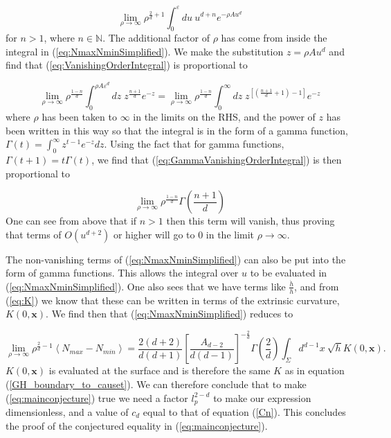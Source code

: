 \documentclass[12pt]{article}
\newcommand{\be}{\begin{equation}}
\newcommand{\ee}{\end{equation}}
\begin{document}
\be\label{eq:VanishingOrderIntegral}
\lim_{\rho \to \infty}\rho^{\frac{2}{d}+1}\int_{0}^{\varepsilon}du\
u^{d+n}e^{-\rho Au^{d}}
\ee
for $n>1$, where $n\in\mathbb{N}$. The additional factor of $\rho$ has come from inside the integral in (\ref{eq:NmaxNminSimplified}). We make the substitution $z=\rho Au^{d}$ and find that (\ref{eq:VanishingOrderIntegral}) is proportional to

\be\label{eq:GammaVanishingOrderIntegral}
\lim_{\rho \to \infty}\rho^{\frac{1-n}{d}}\int_{0}^{\rho A\varepsilon^d}dz\;z^{\frac{n+1}{d}}e^{-z}=\lim_{\rho \to \infty}\rho^{\frac{1-n}{d}}\int_{0}^{\infty}dz\;z^{\left[\left(\frac{n+1}{d}+1\right)-1 \right]}e^{-z}
\ee
where $\rho$ has been taken to $\infty$ in the limits on the RHS, and the power of $z$ has been written in this way so that the integral is in the form of a gamma function, $\Gamma(t)=\int_{0}^{\infty}z^{t-1}e^{-z}dz$. Using the fact that for gamma functions, $\Gamma(t+1)=t\Gamma(t)$, we find that (\ref{eq:GammaVanishingOrderIntegral}) is then proportional to

\be\label{eq:GammaVanishingOrder}
\lim_{\rho \to \infty}\rho^{\frac{1-n}{d}}\Gamma\left(\frac{n+1}{d}\right)
\ee
One can see from above that if $n>1$ then this term will vanish, thus proving that terms of $O(u^{d+2})$ or higher will go to $0$ in the limit $\rho\rightarrow\infty$.

The non-vanishing terms of (\ref{eq:NmaxNminSimplified}) can also be put into the form of gamma functions. This allows the integral over $u$ to be evaluated in (\ref{eq:NmaxNminSimplified}). One also sees that we have terms like $\frac{\dot{h}}{h}$, and from (\ref{eq:K}) we know that these can be written in terms of the extrinsic curvature, $K(0,\mathbf{x})$. We find then that (\ref{eq:NmaxNminSimplified}) reduces to

\be\label{eq:nmax_eq:nmin_end}
\lim_{\rho \to \infty}\rho^{\frac{2}{d}-1}\left\langle N_{max}-N_{min} \right\rangle=
\frac{2(d+2)}{d(d+1)}
\left[\frac{A_{d-2}}{d(d-1)}\right]^{-\frac{2}{d}}
\Gamma\left(\frac{2}{d}\right)\int_{\Sigma}d^{d-1}x\
\sqrt{h}K(0,\mathbf{x}).
\ee
$K(0,\mathbf{x})$ is evaluated at the surface and is therefore the same $K$ as in equation (\ref{GH_boundary_to_causet}). We can therefore conclude that to make (\ref{eq:mainconjecture}) true we need a factor $l_{p}^{2-d}$ to make our expression dimensionless, and a value of $c_d$ equal to that of equation (\ref{Cn}). This concludes the proof of the conjectured equality in (\ref{eq:mainconjecture}).
\end{document}
